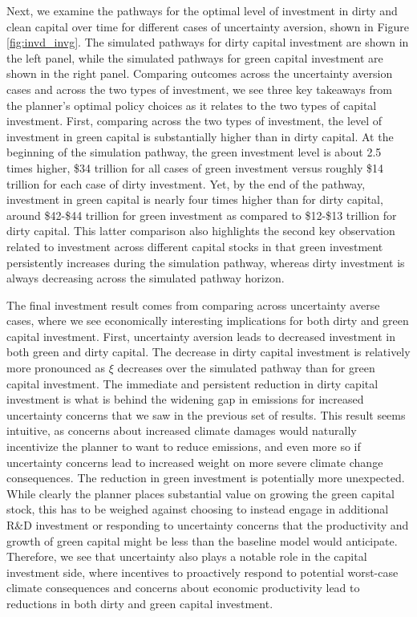 \documentclass[12pt]{article}
\begin{document}
Next, we examine the pathways for the optimal level of investment in dirty and clean capital over time for different cases of uncertainty aversion, shown in Figure \ref{fig:invd_invg}. The simulated pathways for dirty capital investment are shown in the left panel, while the simulated pathways for green capital investment are shown in the right panel. Comparing outcomes across the uncertainty aversion cases and across the two types of investment, we see three key takeaways from the planner's optimal policy choices as it relates to the two types of capital investment. First, comparing across the two types of investment, the level of investment in green capital is substantially higher than in dirty capital. At the beginning of the simulation pathway, the green investment level is about 2.5 times higher, \$34 trillion for all cases of green investment versus roughly \$14 trillion for each case of dirty investment. Yet, by the end of the pathway, investment in green capital is nearly four times higher than for dirty capital, around \$42-\$44 trillion for green investment as compared to \$12-\$13 trillion for dirty capital. This latter comparison also highlights the second key observation related to investment across different capital stocks in that green investment persistently increases during the simulation pathway, whereas dirty investment is always decreasing across the simulated pathway horizon. 

The final investment result comes from comparing across uncertainty averse cases, where we see economically interesting implications for both dirty and green capital investment. First, uncertainty aversion leads to decreased investment in both green and dirty capital. The decrease in dirty capital investment is relatively more pronounced as $\xi$ decreases over the simulated pathway than for green capital investment. The immediate and persistent reduction in dirty capital investment is what is behind the widening gap in emissions for increased uncertainty concerns that we saw in the previous set of results. This result seems intuitive, as concerns about increased climate damages would naturally incentivize the planner to want to reduce emissions, and even more so if uncertainty concerns lead to increased weight on more severe climate change consequences. The reduction in green investment is potentially more unexpected. While clearly the planner places substantial value on growing the green capital stock, this has to be weighed against choosing to instead engage in additional R\&D investment or responding to uncertainty concerns that the productivity and growth of green capital might be less than the baseline model would anticipate. Therefore, we see that uncertainty also plays a notable role in the capital investment side, where incentives to proactively respond to potential worst-case climate consequences and concerns about economic productivity lead to reductions in both dirty and green capital investment.
\end{document}
